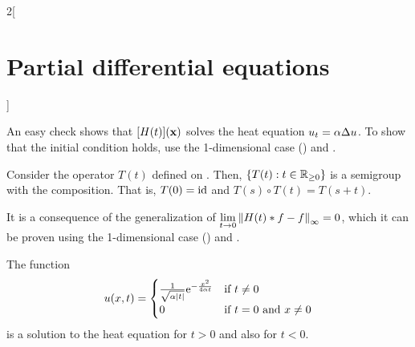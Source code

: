 \documentclass[../../../main_math.tex]{subfiles}
\begin{document}
\begin{multicols}{2}[\section{Partial differential equations}]
  \begin{sproof}
    An easy check shows that $[H(t)](\boldsymbol{\mathrm{x}})$ solves the heat equation $u_t=\alpha\Delta u$. To show that the initial condition holds, use the 1-dimensional case () and .
  \end{sproof}
  \begin{proposition}
    Consider the operator $T(t)$ defined on . Then, $\{T(t):t\in\mathbb{R}_{\geq 0}\}$ is a semigroup with the composition. That is, $T(0)=\mathrm{id}$ and $T(s)\circ T(t)=T(s+t)$.
  \end{proposition}
  \begin{sproof}
    It is a consequence of the generalization of $\displaystyle\lim_{t\to 0}\left\|H(t)*f - f\right\|_\infty=0$, which it can be proven using the 1-dimensional case () and .
  \end{sproof}
  \begin{lemma}
    The function
    \begin{equation*}
      u(x,t)=\begin{cases}
        \frac{1}{\sqrt{\alpha\abs{t}}}\mathrm{e}^{-\frac{x^2}{4\alpha t}} & \text{if $t\ne 0$}           \\
        0                                                          & \text{if $t=0$ and $x\ne 0$}
      \end{cases}
    \end{equation*}
    is a solution to the heat equation for $t>0$ and also for $t<0$.
  \end{lemma}

\end{multicols}
\end{document}
